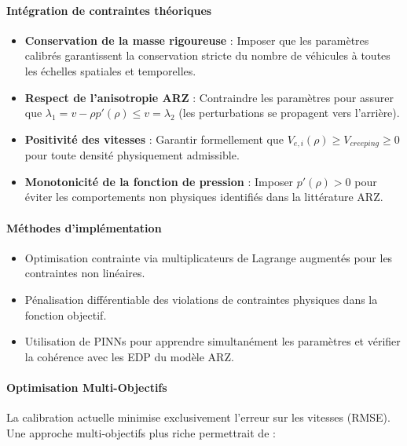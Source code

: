\paragraph{Intégration de contraintes théoriques}
\begin{itemize}
    \item \textbf{Conservation de la masse rigoureuse} : Imposer que les paramètres calibrés garantissent la conservation stricte du nombre de véhicules à toutes les échelles spatiales et temporelles.
    \item \textbf{Respect de l'anisotropie ARZ} : Contraindre les paramètres pour assurer que $\lambda_1 = v - \rho p'(\rho) \leq v = \lambda_2$ (les perturbations se propagent vers l'arrière).
    \item \textbf{Positivité des vitesses} : Garantir formellement que $V_{e,i}(\rho) \geq V_{creeping} \geq 0$ pour toute densité physiquement admissible.
    \item \textbf{Monotonicité de la fonction de pression} : Imposer $p'(\rho) > 0$ pour éviter les comportements non physiques identifiés dans la littérature ARZ.
\end{itemize}

\paragraph{Méthodes d'implémentation}
\begin{itemize}
    \item Optimisation contrainte via multiplicateurs de Lagrange augmentés pour les contraintes non linéaires.
    \item Pénalisation différentiable des violations de contraintes physiques dans la fonction objectif.
    \item Utilisation de PINNs pour apprendre simultanément les paramètres et vérifier la cohérence avec les EDP du modèle ARZ.
\end{itemize}

\paragraph{Optimisation Multi-Objectifs}
La calibration actuelle minimise exclusivement l'erreur sur les vitesses (RMSE). Une approche multi-objectifs plus riche permettrait de :

